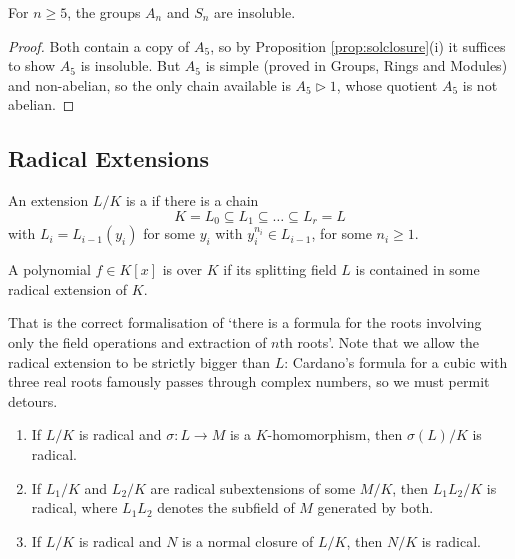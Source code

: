 \begin{corollary}\label{cor:sninsoluble}
	For $n \geq 5$, the groups $A_n$ and $S_n$ are insoluble.
\end{corollary}

\begin{proof}
	Both contain a copy of $A_5$, so by Proposition \ref{prop:solclosure}(i) it suffices to show $A_5$ is insoluble. But $A_5$ is simple (proved in Groups, Rings and Modules) and non-abelian, so the only chain available is $A_5 \rhd 1$, whose quotient $A_5$ is not abelian.
\end{proof}

\subsection{Radical Extensions}

\begin{definition}
	An extension $L/K$ is a  if there is a chain
	$$K = L_0 \subseteq L_1\subseteq\dots\subseteq L_r = L$$
	with $L_i = L_{i-1}(y_i)$ for some $y_i$ with $y_i^{n_i}\in L_{i-1}$, for some $n_i \geq 1$.
\end{definition}

\begin{definition}
	A polynomial $f \in K[x]$ is  over $K$ if its splitting field $L$ is contained in some radical extension of $K$.
\end{definition}

That is the correct formalisation of `there is a formula for the roots involving only the field operations and extraction of $n$th roots'. Note that we allow the radical extension to be strictly bigger than $L$: Cardano's formula for a cubic with three real roots famously passes through complex numbers, so we must permit detours.

\begin{lemma}\label{lem:radclosure}
	\begin{enumerate}[label=(\roman*)]
		\item If $L/K$ is radical and $\sigma : L \to M$ is a $K$-homomorphism, then $\sigma(L)/K$ is radical.
		\item If $L_1/K$ and $L_2/K$ are radical subextensions of some $M/K$, then $L_1L_2/K$ is radical, where $L_1L_2$ denotes the subfield of $M$ generated by both.
		\item If $L/K$ is radical and $N$ is a normal closure of $L/K$, then $N/K$ is radical.
	\end{enumerate}
\end{lemma}

